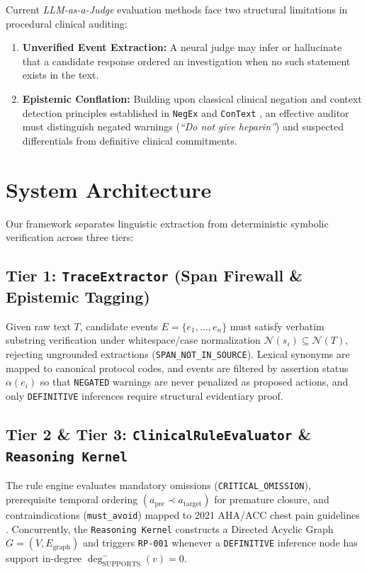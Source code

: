 \documentclass[11pt,a4paper]{article}
\begin{document}
Current \textit{LLM-as-a-Judge} evaluation methods \cite{zheng2023judging} face two structural limitations in procedural clinical auditing:
\begin{enumerate}
    \item \textbf{Unverified Event Extraction:} A neural judge may infer or hallucinate that a candidate response ordered an investigation when no such statement exists in the text.
    \item \textbf{Epistemic Conflation:} Building upon classical clinical negation and context detection principles established in \texttt{NegEx} \cite{chapman2001simple} and \texttt{ConText} \cite{harkema2009context}, an effective auditor must distinguish negated warnings (\textit{``Do not give heparin''}) and suspected differentials from definitive clinical commitments.
\end{enumerate}

\section{System Architecture}
Our framework separates linguistic extraction from deterministic symbolic verification across three tiers:

\subsection{Tier 1: \texttt{TraceExtractor} (Span Firewall \& Epistemic Tagging)}
Given raw text $T$, candidate events $E = \{e_1, \dots, e_n\}$ must satisfy verbatim substring verification under whitespace/case normalization $\mathcal{N}(s_i) \subseteq \mathcal{N}(T)$, rejecting ungrounded extractions (\texttt{SPAN\_NOT\_IN\_SOURCE}). Lexical synonyms are mapped to canonical protocol codes, and events are filtered by assertion status $\alpha(e_i)$ so that \texttt{NEGATED} warnings are never penalized as proposed actions, and only \texttt{DEFINITIVE} inferences require structural evidentiary proof.

\subsection{Tier 2 \& Tier 3: \texttt{ClinicalRuleEvaluator} \& \texttt{Reasoning Kernel}}
The rule engine evaluates mandatory omissions (\texttt{CRITICAL\_OMISSION}), prerequisite temporal ordering $(a_{\text{pre}} \prec a_{\text{target}})$ for premature closure, and contraindications (\texttt{must\_avoid}) mapped to 2021 AHA/ACC chest pain guidelines \cite{gulati2021aha}. Concurrently, the \texttt{Reasoning Kernel} constructs a Directed Acyclic Graph $G = (V, E_{\text{graph}})$ and triggers \texttt{RP-001} whenever a \texttt{DEFINITIVE} inference node has support in-degree $\deg^{-}_{\text{SUPPORTS}}(v) = 0$.
\end{document}
